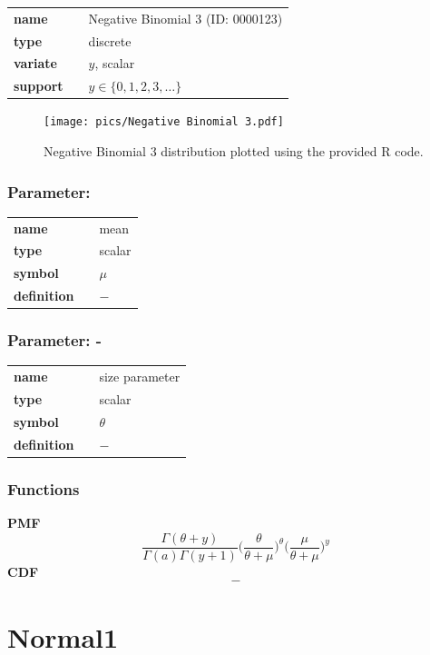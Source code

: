 \documentclass{article}
\begin{document}
  \bigskip 

\begin{tabular}{p{2cm}cl}
\textbf{name} & & Negative Binomial 3 (ID: 0000123)\\ 
 
\textbf{type} & & discrete \\ 

\textbf{variate} & & $y$, scalar \\ 

\textbf{support} & & $y \in \{0,1,2,3,\dots\}$
\end{tabular}

\begin{figure}[ht!]
\centering
  \texttt{[image: pics/Negative Binomial 3.pdf]}
 \caption{Negative Binomial 3 distribution plotted using the provided R code.}
 \label{fig:Negative Binomial 3}
\end{figure}

\subsubsection*{Parameter: }

\noindent\begin{tabular}{p{2cm}cl}
\textbf{name} & & mean \\
\textbf{type} & & scalar \\
\textbf{symbol} & & $\mu$  \\
\textbf{definition} & & $-$
\end{tabular}
\subsubsection*{Parameter: -}

\noindent\begin{tabular}{p{2cm}cl}
\textbf{name} & & size parameter \\
\textbf{type} & & scalar \\
\textbf{symbol} & & $\theta$  \\
\textbf{definition} & & $-$
\end{tabular}
\subsubsection*{Functions}

\smallskip \noindent \hspace{.2cm} \textbf{PMF} 
\begin{equation*}\frac{\Gamma(\theta + y)}{\Gamma(a)\Gamma(y+1)} \Big(\frac{\theta}{\theta + \mu} \Big)^{\theta} 
\Big(\frac{\mu}{\theta + \mu} \Big)^{y}\end{equation*}
\smallskip \noindent \hspace{.2cm} \textbf{CDF} 
\begin{equation*}-\end{equation*}
\smallskip\section*{Normal1} 
\end{document}

